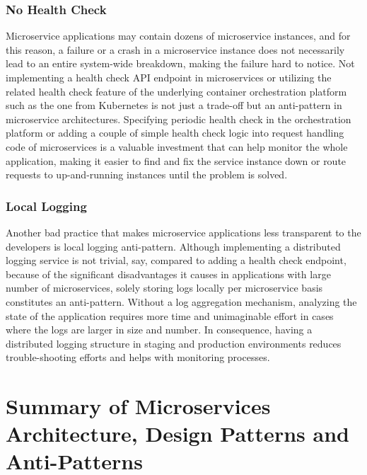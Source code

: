 \documentclass{Configuration_Files/PoliMi3i_thesis}
\begin{document}
\subsubsection{No Health Check}
\label{subsubsec:no_health_check}

Microservice applications may contain dozens of microservice instances, and for this reason, a failure or a crash in a microservice instance does not necessarily lead to an entire system-wide breakdown, making the failure hard to notice.
Not implementing a health check API endpoint in microservices or utilizing the related health check feature of the underlying container orchestration platform such as the one from Kubernetes is not just a trade-off but an anti-pattern in microservice architectures.
Specifying periodic health check in the orchestration platform or adding a couple of simple health check logic into request handling code of microservices is a valuable investment that can help monitor the whole application, making it easier to find and fix the service instance down or route requests to up-and-running instances until the problem is solved.

\subsubsection{Local Logging}
\label{subsubsec:local_logging}

Another bad practice that makes microservice applications less transparent to the developers is local logging anti-pattern.
Although implementing a distributed logging service is not trivial, say, compared to adding a health check endpoint, because of the significant disadvantages it causes in applications with large number of microservices, solely storing logs locally per microservice basis constitutes an anti-pattern.
Without a log aggregation mechanism, analyzing the state of the application requires more time and unimaginable effort in cases where the logs are larger in size and number.
In consequence, having a distributed logging structure in staging and production environments reduces trouble-shooting efforts and helps with monitoring processes.

\section{Summary of Microservices Architecture, Design Patterns and Anti-Patterns}
\label{sec:state_of_the_art_summary}
\end{document}
